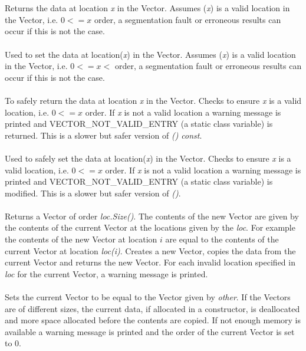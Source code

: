   \\
 \\
Returns the data at location {\em x} in the Vector. Assumes ({\em x}) 
is a valid location in the Vector, i.e. $0 <= x $ order, a
segmentation fault or erroneous results can occur if this is not the 
case. \\ 

 \\
Used to set the data at location({\em x}) in the Vector. Assumes ({\em x})
is a valid location in the Vector, i.e. $0 <= x < $ order, a
segmentation fault or erroneous results can occur if this is not the
case. \\ 

 \\
To safely return the data at location {\em x} in the Vector. Checks to
ensure {\em x} is a valid location, i.e. $0 <= x $ order. If {\em x}
is not a valid location a warning message is printed and
VECTOR\_NOT\_VALID\_ENTRY (a static class variable) is returned. This
is a slower but safer version of {\em () const}.\\ 

 \\
Used to safely set the data at location({\em x}) in the Vector. Checks
to ensure {\em x} is a valid location, i.e. $0 <= x $ order. If {\em
x} is not a valid location a warning message is printed and
VECTOR\_NOT\_VALID\_ENTRY (a static class variable) is modified. This
is a slower but safer version of {\em ()}.\\ 

\\ 
Returns a Vector of order {\em loc.Size()}. The contents of the new
Vector are given by the contents of the current Vector at the
locations given by the {\em loc}. For example the contents of the new
Vector at location $i$ are equal to the contents of the current Vector
at location {\em loc(i)}. Creates a new Vector, copies the data from
the current Vector and returns the new Vector. For each invalid
location specified in {\em loc} for the current Vector, a warning
message is printed.\\ 

\\
Sets the current Vector to be equal to the Vector given by {\em
other}. If the Vectors are of different sizes, the current data, if
allocated in a constructor, is deallocated and more space allocated
before the contents are copied. If not enough memory is available a
warning message is printed and the order of the current Vector is set
to $0$.\\ 

